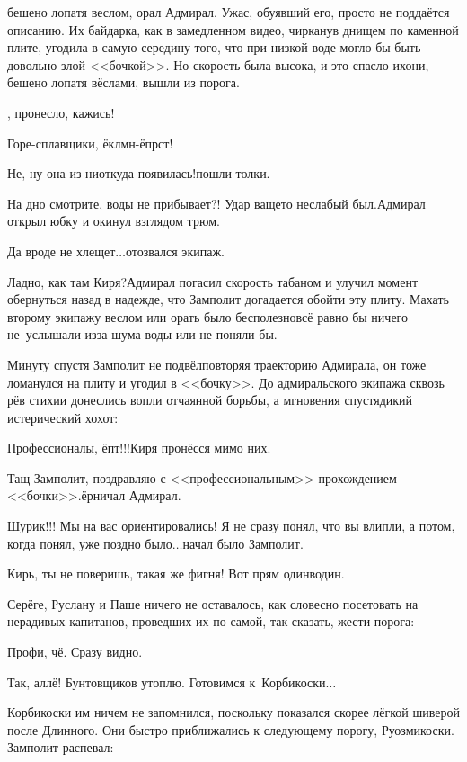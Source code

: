 \mdash бешено лопатя веслом, орал Адмирал. Ужас, обуявший его, просто не поддаётся описанию. Их байдарка, как в замедленном видео, чирканув днищем по каменной плите, угодила в самую середину того, что при низкой воде могло бы быть довольно злой <<бочкой>>. Но скорость была высока, и это спасло их\mdash они, бешено лопатя вёслами, вышли из порога.%

, пронесло, кажись!

\diagdash Горе-сплавщики, ёклмн-ёпрст!

\diagdash Не, ну она из ниоткуда появилась!\mdash пошли толки.

\diagdash На дно смотрите, воды не прибывает?! Удар ваще\sdash то неслабый был.\mdash Адмирал открыл юбку и окинул взглядом трюм.

\diagdash Да вроде не хлещет$\ldots$\mdash отозвался экипаж.

\diagdash Ладно, как там Киря?\mdash Адмирал погасил скорость табаном и улучил момент обернуться назад в надежде, что Замполит догадается обойти эту плиту. Махать второму экипажу веслом или орать было бесполезно\mdash всё равно бы ничего не~услышали из\sdash за шума воды или не поняли бы. 

Минуту спустя Замполит не подвёл\mdash повторяя траекторию Адмирала, он тоже ломанулся на плиту и угодил в <<бочку>>. До адмиральского экипажа сквозь рёв стихии донеслись вопли отчаянной борьбы, а мгновения спустя\mdash дикий истерический хохот:

\diagdash Профессионалы, ёпт!!!\mdash Киря пронёсся мимо них.

\diagdash Тащ Замполит, поздравляю с <<профессиональным>> прохождением <<бочки>>.\mdash ёрничал Адмирал.

\diagdash Шурик!!! Мы на вас ориентировались! Я не сразу понял, что вы влипли, а потом, когда понял, уже поздно было$\ldots$\mdash начал было Замполит.

\diagdash Кирь, ты не поверишь, такая же фигня! Вот прям один\sdash в\sdash один.

Серёге, Руслану и Паше ничего не оставалось, как словесно посетовать на нерадивых капитанов, проведших их по самой, так сказать, жести порога:

\diagdash Профи, чё. Сразу видно.

\diagdash Так, аллё! Бунтовщиков утоплю. Готовимся к~Корбикоски$\ldots$

Корбикоски им ничем не запомнился, поскольку показался скорее лёгкой шиверой после Длинного. Они быстро приближались к следующему порогу, Руозмикоски. Замполит распевал:

